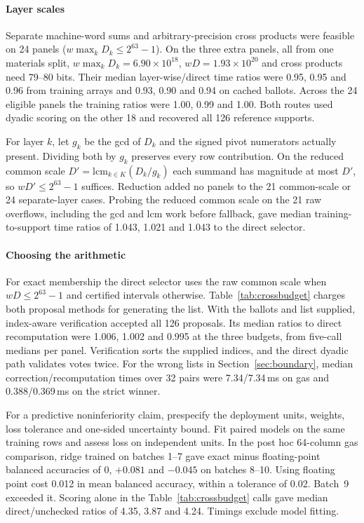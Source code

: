 \paragraph{Layer scales}
Separate machine-word sums and arbitrary-precision cross products were feasible on 24 panels ($w\max_kD_k\le2^{63}-1$). On the three extra panels, all from one materials split, $w\max_kD_k=6.90\times10^{18}$, $wD=1.93\times10^{20}$ and cross products need 79--80 bits. Their median layer-wise/direct time ratios were 0.95, 0.95 and 0.96 from training arrays and 0.93, 0.90 and 0.94 on cached ballots. Across the 24 eligible panels the training ratios were 1.00, 0.99 and 1.00. Both routes used dyadic scoring on the other 18 and recovered all 126 reference supports.

For layer $k$, let $g_k$ be the gcd of $D_k$ and the signed pivot numerators actually present. Dividing both by $g_k$ preserves every row contribution. On the reduced common scale $D'=\mathrm{lcm}_{k\in K}(D_k/g_k)$ each summand has magnitude at most $D'$, so $wD'\le2^{63}-1$ suffices. Reduction added no panels to the 21 common-scale or 24 separate-layer cases. Probing the reduced common scale on the 21 raw overflows, including the gcd and lcm work before fallback, gave median training-to-support time ratios of 1.043, 1.021 and 1.043 to the direct selector.

\paragraph{Choosing the arithmetic}
For exact membership the direct selector uses the raw common scale when $wD\le2^{63}-1$ and certified intervals otherwise. Table~\ref{tab:crossbudget} charges both proposal methods for generating the list. With the ballots and list supplied, index-aware verification accepted all 126 proposals. Its median ratios to direct recomputation were 1.006, 1.002 and 0.995 at the three budgets, from five-call medians per panel. Verification sorts the supplied indices, and the direct dyadic path validates votes twice. For the wrong lists in Section~\ref{sec:boundary}, median correction/recomputation times over 32 pairs were 7.34/7.34\,ms on gas and 0.388/0.369\,ms on the strict winner.

For a predictive noninferiority claim, prespecify the deployment units, weights, loss tolerance and one-sided uncertainty bound. Fit paired models on the same training rows and assess loss on independent units. In the post hoc 64-column gas comparison, ridge trained on batches 1--7 gave exact minus floating-point balanced accuracies of $0$, $+0.081$ and $-0.045$ on batches 8--10. Using floating point cost 0.012 in mean balanced accuracy, within a tolerance of 0.02. Batch~9 exceeded it. Scoring alone in the Table~\ref{tab:crossbudget} calls gave median direct/unchecked ratios of 4.35, 3.87 and 4.24. Timings exclude model fitting.
